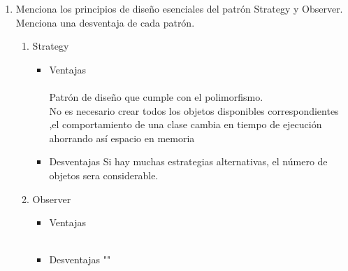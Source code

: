 \documentclass[a4paper,10pt]{article}
\begin{document}
\begin{enumerate}
    
    \item Menciona los principios de diseño esenciales del patrón Strategy y Observer. Menciona una desventaja de cada patrón.
        \begin{enumerate}
            \item Strategy
            \begin{itemize}
                \item \colorbox[rgb]{0.69, 0.93, 0.93}{Ventajas}\\\\
                      Patrón de diseño que cumple con el polimorfismo.\\
                      No es necesario crear todos los objetos disponibles correspondientes ,el comportamiento de una clase cambia en tiempo
                      de ejecución ahorrando así espacio en memoria \\

                \item \colorbox[rgb]{1.0, 0.43, 0.29}{Desventajas}
                      Si hay muchas estrategias alternativas, el número de objetos sera considerable.\\
                      

            \end{itemize}

            \item Observer
            \begin{itemize}
                \item \colorbox[rgb]{0.69, 0.93, 0.93}{Ventajas}\\\\
                      

                \item \colorbox[rgb]{1.0, 0.43, 0.29}{Desventajas}
                      ""      

            \end{itemize}    
            
        \end{enumerate}
        
       
        
                 

\end{enumerate}
\end{document}
